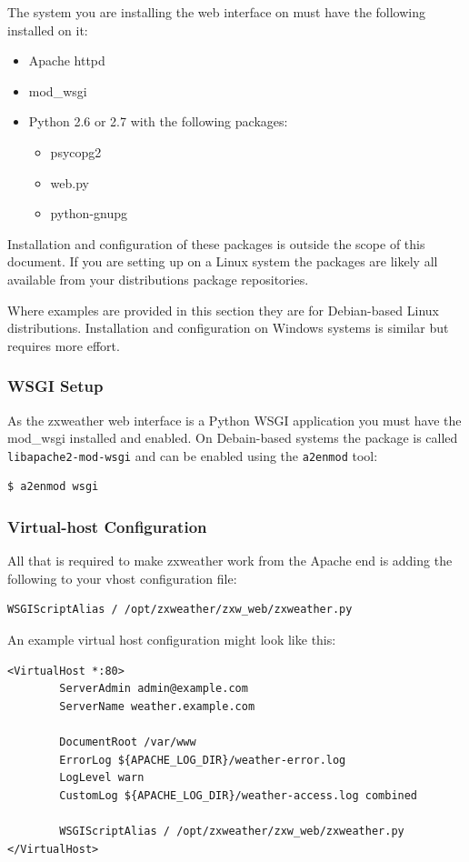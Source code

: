\documentclass[a4paper,10pt,draft]{book}
\begin{document}
The system you are installing the web interface on must have the following installed on it:
\begin{itemize}
\item Apache httpd
\item mod\_wsgi
\item Python 2.6 or 2.7 with the following packages:
\begin{itemize}
\item psycopg2
\item web.py
\item python-gnupg
\end{itemize}
\end{itemize}

Installation and configuration of these packages is outside the scope of this document. If you are setting up on a Linux system the packages are likely all available from your distributions package repositories. 

Where examples are provided in this section they are for Debian-based Linux distributions. Installation and configuration on Windows systems is similar but requires more effort.

\subsubsection{WSGI Setup}
As the zxweather web interface is a Python WSGI application you must have the mod\_wsgi installed and enabled. On Debain-based systems the package is called \verb|libapache2-mod-wsgi| and can be enabled using the \verb|a2enmod| tool:

\begin{verbatim}
$ a2enmod wsgi
\end{verbatim}

\subsubsection{Virtual-host Configuration}

All that is required to make zxweather work from the Apache end is adding the following to your vhost configuration file:
\begin{verbatim}
WSGIScriptAlias / /opt/zxweather/zxw_web/zxweather.py
\end{verbatim}

An example virtual host configuration might look like this:

\begin{verbatim}
<VirtualHost *:80>
        ServerAdmin admin@example.com
        ServerName weather.example.com

        DocumentRoot /var/www
        ErrorLog ${APACHE_LOG_DIR}/weather-error.log
        LogLevel warn
        CustomLog ${APACHE_LOG_DIR}/weather-access.log combined

        WSGIScriptAlias / /opt/zxweather/zxw_web/zxweather.py
</VirtualHost>
\end{verbatim}
\end{document}
